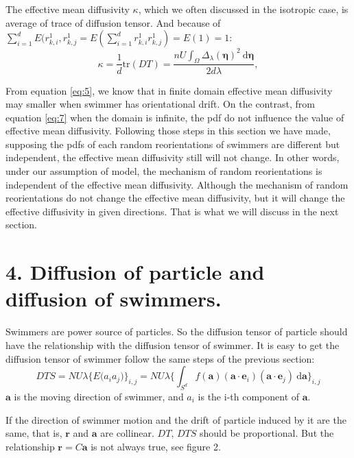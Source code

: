 \documentclass[12pt,a4paper]{article}
\begin{document}
The effective mean diffusivity $\kappa$, which we often discussed in the
isotropic case, is average of trace of diffusion tensor. And because
of
$\sum_{i=1}^{d}E(r_{k,i}^{1},r_{k,j}^{1}=E(\sum_{i=1}^{d}r_{k,i}^{1}r_{k,j}^{1})=E(1)=1$:
\begin{equation}
  \label{eq:7}
  \kappa=\frac{1}{d}\mathrm{tr}(DT)=\frac{nU\int_{\Omega}\Delta_{\lambda}(\bm{\eta})^{2}\ \mathrm{d}\bm{\eta}}{2d\lambda},
\end{equation}

From equation \eqref{eq:5}, we know that in finite domain effective
mean diffusivity may smaller when swimmer has orientational drift. On
the contrast, from equation \eqref{eq:7} when the domain is infinite,
the pdf do not influence the value of effective mean
diffusivity. Following those steps in this section we have made,
supposing the pdfs of each random reorientations of swimmers are
different but independent, the effective mean diffusivity still will
not change. In other words, under our assumption of model, the
mechanism of random reorientations is independent of the effective
mean diffusivity. Although the mechanism of random reorientations do
not change the effective mean diffusivity, but it will change the
effective diffusivity in given directions. That is what we will
discuss in the next section.

\section*{\normalsize{4. Diffusion of particle and diffusion of
    swimmers.}}

Swimmers are power source of particles. So the diffusion tensor of
particle should have the relationship with the diffusion tensor of
swimmer. It is easy to get the diffusion tensor of swimmer follow the
same steps of the previous section:
\begin{equation}
  \label{eq:8}
  DTS=NU\lambda\{E\Big(a_{i}a_{j}\Big)\}_{i,j}=NU\lambda\{\int_{S^{d}}
  f(\bm{a})(\bm{a}\cdot\bm{e}_{i})(\bm{a}\cdot\bm{e}_{j})\ \mathrm{d}\bm{a}\}_{i,j}
\end{equation}
$\bm{a}$ is the moving direction of swimmer, and $a_{i}$ is the i-th
component of $\bm{a}$. 

If the direction of swimmer motion and the drift of particle induced
by it are the same, that is, $\bm{r}$ and $\bm{a}$ are
collinear. $DT$, $DTS$ should be proportional. But the relationship
$\bm{r}=C\bm{a}$ is not always true, see figure 2.
\end{document}
